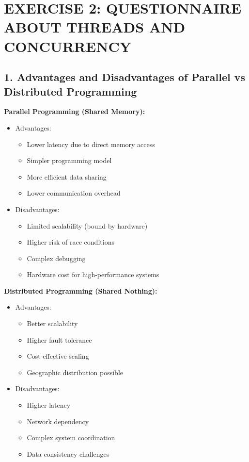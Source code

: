 \documentclass{article}
\begin{document}
\section*{EXERCISE 2: QUESTIONNAIRE ABOUT THREADS AND CONCURRENCY}

\subsection*{1. Advantages and Disadvantages of Parallel vs Distributed Programming}

\textbf{Parallel Programming (Shared Memory):}
\begin{itemize}
    \item Advantages:
    \begin{itemize}
        \item Lower latency due to direct memory access
        \item Simpler programming model
        \item More efficient data sharing
        \item Lower communication overhead
    \end{itemize}
    \item Disadvantages:
    \begin{itemize}
        \item Limited scalability (bound by hardware)
        \item Higher risk of race conditions
        \item Complex debugging
        \item Hardware cost for high-performance systems
    \end{itemize}
\end{itemize}

\textbf{Distributed Programming (Shared Nothing):}
\begin{itemize}
    \item Advantages:
    \begin{itemize}
        \item Better scalability
        \item Higher fault tolerance
        \item Cost-effective scaling
        \item Geographic distribution possible
    \end{itemize}
    \item Disadvantages:
    \begin{itemize}
        \item Higher latency
        \item Network dependency
        \item Complex system coordination
        \item Data consistency challenges
    \end{itemize}
\end{itemize}
\end{document}
